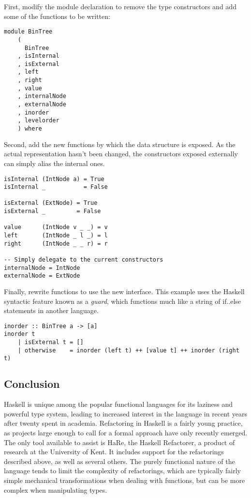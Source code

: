 \documentclass{article}
\begin{document}
First, modify the module declaration to remove the type constructors and add some of the functions to be written:

\begin{verbatim}
module BinTree
    (
      BinTree
    , isInternal
    , isExternal
    , left
    , right
    , value
    , internalNode
    , externalNode
    , inorder
    , levelorder
    ) where
\end{verbatim}

Second, add the new functions by which the data structure is exposed.  As the actual representation hasn't been changed, the constructors exposed externally can simply alias the internal ones.

\begin{verbatim}
isInternal (IntNode a) = True
isInternal _           = False

isExternal (ExtNode) = True
isExternal _         = False

value      (IntNode v _ _) = v
left       (IntNode _ l _) = l
right      (IntNode _ _ r) = r

-- Simply delegate to the current constructors
internalNode = IntNode
externalNode = ExtNode
\end{verbatim}

Finally, rewrite functions to use the new interface.  This example uses the Haskell syntactic feature known as a \textit{guard}, which functions much like a string of if..else statements in another language.

\begin{verbatim}
inorder :: BinTree a -> [a]
inorder t
    | isExternal t = []
    | otherwise    = inorder (left t) ++ [value t] ++ inorder (right t)
\end{verbatim}

\subsection{Conclusion}

Haskell is unique among the popular functional languages for its laziness and powerful type system, leading to increased interest in the language in recent years after twenty spent in academia.
Refactoring in Haskell is a fairly young practice, as projects large enough to call for a formal approach have only recently emerged.
The only tool available to assist is HaRe, the Haskell Refactorer\cite{li2006refactoring}, a product of research at the University of Kent.
It includes support for the refactorings described above, as well as several others.
The purely functional nature of the language tends to limit the complexity of refactorings, which are typically fairly simple mechanical transformations when dealing with functions, but can be more complex when manipulating types.




\end{document}
